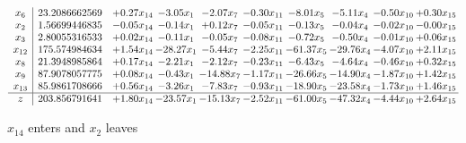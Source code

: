 \documentclass[9pt]{article}
\begin{document}
 \[\begin{array}{c| c c@{\hskip 2pt} c@{\hskip 2pt} c@{\hskip 2pt} c@{\hskip 2pt} c@{\hskip 2pt} c@{\hskip 2pt} c@{\hskip 2pt} c@{\hskip 2pt} }
 x_{6}   &  23.2086662569 & +  0.27 x_{14} & -3.05 x_{1} & -2.07 x_{7} & -0.30 x_{11} & -8.01 x_{5} & -5.11 x_{4} & -0.50 x_{10} & +  0.30 x_{15}\\
 x_{2}   &  1.56699446835 & -0.05 x_{14} & -0.14 x_{1} & +  0.12 x_{7} & -0.05 x_{11} & -0.13 x_{5} & -0.04 x_{4} & -0.02 x_{10} & -0.00 x_{15}\\
 x_{3}   &  2.80055316533 & +  0.02 x_{14} & -0.11 x_{1} & -0.05 x_{7} & -0.08 x_{11} & -0.72 x_{5} & -0.50 x_{4} & -0.01 x_{10} & +  0.06 x_{15}\\
 x_{12}   &  175.574984634 & +  1.54 x_{14} & -28.27 x_{1} & -5.44 x_{7} & -2.25 x_{11} & -61.37 x_{5} & -29.76 x_{4} & -4.07 x_{10} & +  2.11 x_{15}\\
 x_{8}   &  21.3948985864 & +  0.17 x_{14} & -2.21 x_{1} & -2.12 x_{7} & -0.23 x_{11} & -6.43 x_{5} & -4.64 x_{4} & -0.46 x_{10} & +  0.32 x_{15}\\
 x_{9}   &  87.9078057775 & +  0.08 x_{14} & -0.43 x_{1} & -14.88 x_{7} & -1.17 x_{11} & -26.66 x_{5} & -14.90 x_{4} & -1.87 x_{10} & +  1.42 x_{15}\\
 x_{13}   &  85.9861708666 & +  0.56 x_{14} & -3.26 x_{1} & -7.83 x_{7} & -0.93 x_{11} & -18.90 x_{5} & -23.58 x_{4} & -1.73 x_{10} & +  1.46 x_{15}\\
\hline
z    &  203.856791641 & +  1.80 x_{14} & -23.57 x_{1} & -15.13 x_{7} & -2.52 x_{11} & -61.00 x_{5} & -47.32 x_{4} & -4.44 x_{10} & +  2.64 x_{15}\\
\end{array}\]


 $ x_{14} $ enters and $ x_{2} $ leaves 
\end{document}
